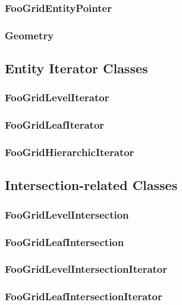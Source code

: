 \documentclass[11pt,a4paper,headinclude,footinclude,DIV16,normalheadings]{scrreprt}
\begin{document}
\subsubsection{FooGridEntityPointer}

\subsubsection{Geometry}

\subsection{Entity Iterator Classes}

\subsubsection{FooGridLevelIterator}

\subsubsection{FooGridLeafIterator}

\subsubsection{FooGridHierarchicIterator}

\subsection{Intersection-related Classes}

\subsubsection{FooGridLevelIntersection}

\subsubsection{FooGridLeafIntersection}

\subsubsection{FooGridLevelIntersectionIterator}

\subsubsection{FooGridLeafIntersectionIterator}
\end{document}
